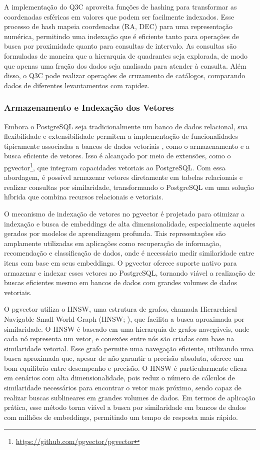 A implementação do Q3C aproveita funções de hashing para transformar as coordenadas esféricas em valores que podem ser facilmente indexados. Esse processo de hash mapeia coordenadas (RA, DEC) para uma representação numérica, permitindo uma indexação que é eficiente tanto para operações de busca por proximidade quanto para consultas de intervalo. As consultas são formuladas de maneira que a hierarquia de quadrantes seja explorada, de modo que apenas uma fração dos dados seja analisada para atender à consulta. Além disso, o Q3C pode realizar operações de cruzamento de catálogos, comparando dados de diferentes levantamentos com rapidez.


\subsubsection{Armazenamento e Indexação dos Vetores}
\label{sec:si-vec-index}

Embora o PostgreSQL seja tradicionalmente um banco de dados relacional, sua flexibilidade e extensibilidade permitem a implementação de funcionalidades tipicamente associadas a bancos de dados vetoriais \cite{taipalus2024}, como o armazenamento e a busca eficiente de vetores. Isso é alcançado por meio de extensões, como o pgvector\footnote{\url{https://github.com/pgvector/pgvector}}, que integram capacidades vetoriais ao PostgreSQL. Com essa abordagem, é possível armazenar vetores diretamente em tabelas relacionais e realizar consultas por similaridade, transformando o PostgreSQL em uma solução híbrida que combina recursos relacionais e vetoriais.

O mecanismo de indexação de vetores no pgvector é projetado para otimizar a indexação e busca de embeddings de alta dimensionalidade, especialmente aqueles gerados por modelos de aprendizagem profunda. Tais representações são amplamente utilizadas em aplicações como recuperação de informação, recomendação e classificação de dados, onde é necessário medir similaridade entre itens com base em seus embeddings. O pgvector oferece suporte nativo para armazenar e indexar esses vetores no PostgreSQL, tornando viável a realização de buscas eficientes mesmo em bancos de dados com grandes volumes de dados vetoriais.

O pgvector utiliza o HNSW, uma estrutura de grafos, chamada Hierarchical Navigable Small World Graph (HNSW; \citealp{hnsw}), que facilita a busca aproximada por similaridade. O HNSW é baseado em uma hierarquia de grafos navegáveis, onde cada nó representa um vetor, e conexões entre nós são criadas com base na similaridade vetorial. Esse grafo permite uma navegação eficiente, utilizando uma busca aproximada que, apesar de não garantir a precisão absoluta, oferece um bom equilíbrio entre desempenho e precisão. O HNSW é particularmente eficaz em cenários com alta dimensionalidade, pois reduz o número de cálculos de similaridade necessários para encontrar o vetor mais próximo, sendo capaz de realizar buscas sublineares em grandes volumes de dados. Em termos de aplicação prática, esse método torna viável a busca por similaridade em bancos de dados com milhões de embeddings, permitindo um tempo de resposta mais rápido.




